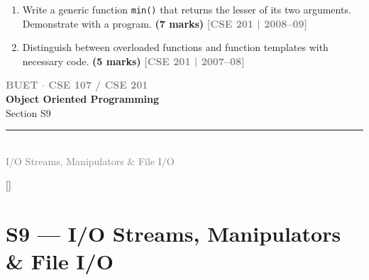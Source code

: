 \documentclass[12pt,a3paper]{article}
\newcommand{\yr}[1]{\hfill\textcolor{gray}{\small\textbf{[#1]}}}
\newcommand{\mk}[1]{\textcolor{orange!70!black}{\small\textbf{(#1 marks)}}}
\newcommand{\secdivider}[4]{%
  \newpage\thispagestyle{empty}%
  \vspace*{\fill}%
  \begin{tcolorbox}[enhanced,colback=#4!7,colframe=#3,boxrule=1.5pt,arc=8pt,
    left=20pt,right=20pt,top=22pt,bottom=22pt,
    shadow={3pt}{-3pt}{0pt}{black!15}]
    \centering
    {\large\textcolor{gray}{\textbf{BUET $\cdot$ CSE 107 / CSE 201}}}\\[8pt]
    {\fontsize{26}{32}\selectfont\bfseries\textcolor{#3}{Object Oriented Programming}}\\[6pt]
    {\fontsize{15}{19}\selectfont\textcolor{dgray}{#1}}\\[12pt]
    \textcolor{#3!60}{\rule{0.5\textwidth}{0.5pt}}\\[6pt]
    {\small\textcolor{gray}{#2}}
  \end{tcolorbox}%
  \vspace*{\fill}\newpage%
}
\begin{document}
\begin{enumerate}
\item Write a generic function \texttt{min()} that returns the lesser of its two arguments. Demonstrate with a program. \mk{7}
\yr{CSE 201 | 2008--09}




\item Distinguish between overloaded functions and function templates with necessary code. \mk{5}
\yr{CSE 201 | 2007--08}







\end{enumerate}

\secdivider{Section S9}{I/O Streams, Manipulators \& File I/O}{cA}{cA}
\label{sec:S9}
\titleformat{\section}{\large\bfseries\color{cA}}{}{0em}{}[\titlerule]
\section{S9 --- I/O Streams, Manipulators \& File I/O}
\end{document}
